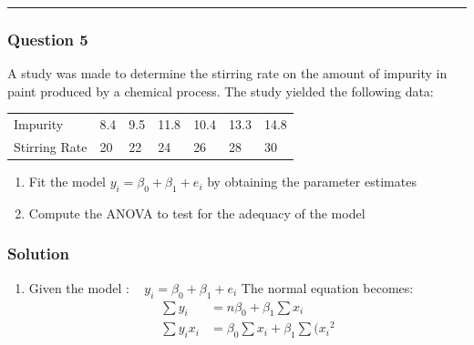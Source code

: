 \documentclass[
]{article}
\providecommand{\tightlist}{%
  \setlength{\itemsep}{0pt}\setlength{\parskip}{0pt}}
\begin{document}
\begin{center}\rule{0.5\linewidth}{0.5pt}\end{center}

\subsubsection{Question 5}\label{question-5}

A study was made to determine the stirring rate on the amount of
impurity in paint produced by a chemical process. The study yielded the
following data:

\begin{longtable}[]{@{}lllllll@{}}
\toprule\noalign{}
\endhead
\bottomrule\noalign{}
\endlastfoot
Impurity & 8.4 & 9.5 & 11.8 & 10.4 & 13.3 & 14.8 \\
Stirring Rate & 20 & 22 & 24 & 26 & 28 & 30 \\
\end{longtable}

\begin{enumerate}
\def\labelenumi{\alph{enumi}.}
\tightlist
\item
  Fit the model \(y_i = \beta_0 + \beta_1 + e_i\) by obtaining the
  parameter estimates
\item
  Compute the ANOVA to test for the adequacy of the model
\end{enumerate}

\subsubsection{Solution}\label{solution-4}

\begin{enumerate}
\def\labelenumi{\alph{enumi}.}
\tightlist
\item
  Given the model \(\colon \quad y_i = \beta_0 + \beta_1 + e_i\) The
  normal equation becomes: \begin{align*}
    \sum y_i & = n\beta_0 + \beta_1 \sum x_i  \\
    \sum y_ix_i & = \beta_0 \sum x_i  + \beta_1 \sum (x_i{^2}
  \end{align*}
\end{enumerate}
\end{document}
